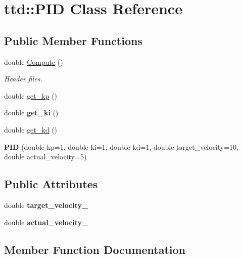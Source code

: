 \hypertarget{classttd_1_1PID}{}\section{ttd\+:\+:P\+ID Class Reference}
\label{classttd_1_1PID}
\subsection*{Public Member Functions}
\begin{DoxyCompactItemize}
\item 
double \hyperlink{classttd_1_1PID_a296c7b460949bb9f9883d9990dc59415}{Compute} ()
\begin{DoxyCompactList}\small\item\em Header files. \end{DoxyCompactList}\item 
double \hyperlink{classttd_1_1PID_a21a0403413a68aa1da98a75257dbde8a}{get\+\_\+kp} ()
\item 
\mbox{\label{classttd_1_1PID_aaee3d5cd5e3dce62590c0fc6b554fa07}} 
double {\bfseries get\+\_\+ki} ()
\item 
double \hyperlink{classttd_1_1PID_a84e6add940d84fab262f98a835cdb97a}{get\+\_\+kd} ()
\item 
\mbox{\label{classttd_1_1PID_aac6255851baf7e31ddf00bde7439b539}} 
{\bfseries P\+ID} (double kp=1, double ki=1, double kd=1, double target\+\_\+velocity=10, double actual\+\_\+velocity=5)
\end{DoxyCompactItemize}
\subsection*{Public Attributes}
\begin{DoxyCompactItemize}
\item 
\mbox{\label{classttd_1_1PID_a2a3149842acf22de82012477999c861c}} 
double {\bfseries target\+\_\+velocity\+\_\+}
\item 
\mbox{\label{classttd_1_1PID_a4b25b31ff787740f372e2d92f4198b8a}} 
double {\bfseries actual\+\_\+velocity\+\_\+}
\end{DoxyCompactItemize}


\subsection{Member Function Documentation}
\mbox{\label{classttd_1_1PID_a296c7b460949bb9f9883d9990dc59415}} 
